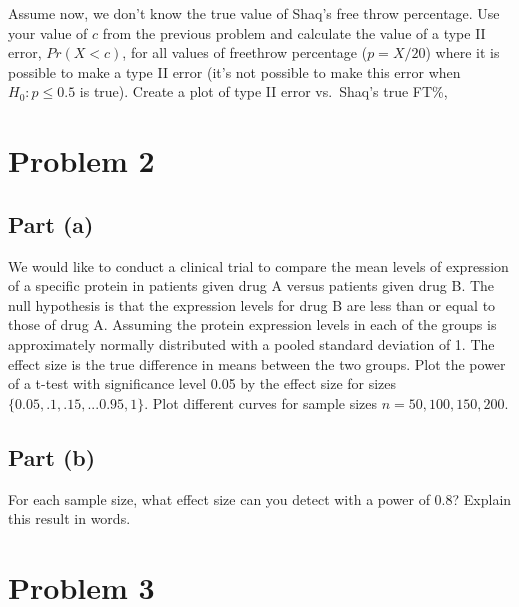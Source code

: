 \documentclass[]{article}
\newenvironment{Shaded}{\begin{snugshade}}{\end{snugshade}}
\newcommand{\KeywordTok}[1]{\textcolor[rgb]{0.13,0.29,0.53}{\textbf{#1}}}
\newcommand{\DecValTok}[1]{\textcolor[rgb]{0.00,0.00,0.81}{#1}}
\newcommand{\StringTok}[1]{\textcolor[rgb]{0.31,0.60,0.02}{#1}}
\newcommand{\CommentTok}[1]{\textcolor[rgb]{0.56,0.35,0.01}{\textit{#1}}}
\newcommand{\OperatorTok}[1]{\textcolor[rgb]{0.81,0.36,0.00}{\textbf{#1}}}
\newcommand{\NormalTok}[1]{#1}
\begin{document}
Assume now, we don't know the true value of Shaq's free throw
percentage. Use your value of \(c\) from the previous problem and
calculate the value of a type II error, \(Pr(X < c)\), for all values of
freethrow percentage (\(p = X/20\)) where it is possible to make a type
II error (it's not possible to make this error when \(H_0: p \le 0.5\)
is true). Create a plot of type II error vs.~Shaq's true FT\%,

\section{Problem 2}\label{problem-2}

\subsection{Part (a)}\label{part-a-1}

We would like to conduct a clinical trial to compare the mean levels of
expression of a specific protein in patients given drug A versus
patients given drug B. The null hypothesis is that the expression levels
for drug B are less than or equal to those of drug A. Assuming the
protein expression levels in each of the groups is approximately
normally distributed with a pooled standard deviation of 1. The effect
size is the true difference in means between the two groups. Plot the
power of a t-test with significance level 0.05 by the effect size for
sizes \(\{0.05, .1, .15, ... 0.95, 1\}\). Plot different curves for
sample sizes \(n = 50, 100, 150, 200\).

\subsection{Part (b)}\label{part-b-1}

For each sample size, what effect size can you detect with a power of
0.8? Explain this result in words.

\section{Problem 3}\label{problem-3}

\begin{Shaded}
\end{Shaded}
\end{document}
